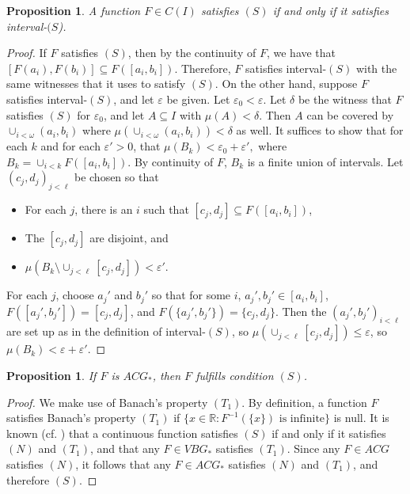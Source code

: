 \documentclass[12pt]{amsart}
\newtheorem{prop}[theorem]{Proposition}
\newcommand{\eps}{\varepsilon}
\begin{document}
\begin{prop}\label{prop:6}
A function $F \in C(I)$ satisfies $(S)$ if and only if it satisfies 
interval-$(S$).\end{prop}
\begin{proof}
If $F$ satisfies $(S)$, then by the continuity of $F$, we have that 
$[F(a_i),F(b_i)] \subseteq F([a_i,b_i])$.  Therefore, $F$ satisfies
interval-$(S)$ with the same witnesses that it uses to satisfy $(S)$.  
On the other hand, suppose $F$ satisfies interval-$(S)$, and let 
$\varepsilon$ be given.  Let $\varepsilon_0<\varepsilon$.  
Let $\delta$ be the witness that $F$ satisfies $(S)$
for $\varepsilon_0$, 
and let $A\subseteq I$ with $\mu(A) < \delta$.  Then $A$ can be covered 
by $\cup_{i<\omega} (a_i,b_i)$ where $\mu(\cup_{i<\omega} (a_i,b_i)) <\delta$ 
as well.  It suffices to show that for each $k$ and for each $\varepsilon'>0$, 
that $\mu(B_k) < \varepsilon_0 + \varepsilon',$
where $B_k = \cup_{i<k} F([a_i,b_i])$.  By continuity of $F$, $B_k$ is a finite 
union of intervals.  Let $(c_j,d_j)_{j<\ell}$ be chosen so that
\begin{itemize}
\item For each $j$, there is an $i$ such that $[c_j,d_j] \subseteq F([a_i,b_i])$,
\item The $[c_j,d_j]$ are disjoint, and
\item $\mu(B_k \setminus \cup_{j<\ell} [c_j,d_j]) < \varepsilon'$.
\end{itemize}
For each $j$, choose $a_j'$ and $b_j'$ so that for some $i$, $a_j',b_j' \in [a_i,b_i]$,
$F([a_j',b_j']) = [c_j,d_j]$, and
$F(\{a_j',b_j'\}) = \{c_j, d_j\}$.
Then the $(a_j',b_j')_{i<\ell}$ are set up as in the definition of interval-$(S)$,
so $\mu(\cup_{j<\ell} [c_j,d_j])\leq \eps$, so $\mu(B_k) < \eps + \eps'$.  
\end{proof}

\begin{prop}\label{banachS}
If $F$ is $ACG_\ast$, then $F$ fulfills condition $(S)$.
\end{prop}
\begin{proof}
We make use of Banach's property $(T_1)$.
By definition, a function $F$ satisfies Banach's property $(T_1)$ if 
$\{x \in \mathbb R : F^{-1}(\{x\}) \text{ is infinite}\}$ is null.  
It is known (cf. \cite[Thm IX.8.4, pg 284; Thm IX.6.3, pg 279]{saks}) 
that a continuous function satisfies $(S)$ if and only if it satisfies 
$(N)$ and $(T_1)$, and that any $F \in VBG_\ast$ satisfies $(T_1)$. 
Since any $F \in ACG$ satisfies $(N)$, it follows that any $F \in ACG_\ast$ 
satisfies $(N)$ and $(T_1)$, and therefore $(S)$.
\end{proof}
\end{document}
